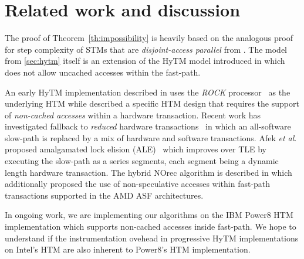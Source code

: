 \section{Related work and discussion}
\label{sec:rel}
%
The proof of Theorem~\ref{th:impossibility} is heavily based on the analogous proof for step complexity of
STMs that are \emph{disjoint-access parallel} from \cite{prog15-pact}.
The model from \cref{sec:hytm} itself is an extension of the HyTM model introduced in \cite{hytm14disc}
which does not allow uncached accesses within the fast-path.

An early HyTM implementation described in \cite{damronhytm} uses the \emph{ROCK} processor~\cite{rock} as the underlying HTM
while \cite{kumarhytm} described a specific HTM design that requires the support of \emph{non-cached accesses}
within a hardware transaction. 
Recent work has investigated fallback to \emph{reduced} hardware transactions~\cite{MS13}
in which an all-software slow-path is replaced by a mix of hardware and software transactions. 
Afek \emph{et al}. proposed amalgamated lock elision (ALE)~\cite{ale15} which improves over TLE
by executing the slow-path as a series segments, each segment being a dynamic length hardware transaction.
The hybrid NOrec algorithm is described in \cite{hynorecriegel} which additionally proposed the use of non-speculative accesses
within fast-path transactions supported in the AMD ASF architectures.

In ongoing work, we are implementing our algorithms on the IBM Power8 HTM implementation which supports
non-cached accesses inside fast-path. We hope to understand if the instrumentation ovehead in
progressive HyTM implementations on Intel's HTM are also inherent to Power8's HTM implementation.